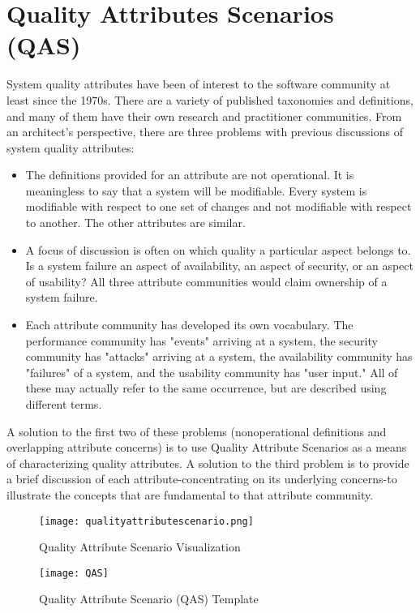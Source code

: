 \section{Quality Attributes Scenarios (QAS)}
System quality attributes have been of interest to the software community at least since the 1970s. There are a variety of published taxonomies and definitions, and many of them have their own research and practitioner communities. From an architect's perspective, there are three problems with previous discussions of system quality attributes:

\begin{itemize}
	\item The definitions provided for an attribute are not operational. It is meaningless to say that a system will be modifiable. Every system is modifiable with respect to one set of changes and not modifiable with respect to another. The other attributes are similar.
	\item A focus of discussion is often on which quality a particular aspect belongs to. Is a system failure an aspect of availability, an aspect of security, or an aspect of usability? All three attribute communities would claim ownership of a system failure.
	\item Each attribute community has developed its own vocabulary. The performance community has "events" arriving at a system, the security community has "attacks" arriving at a system, the availability community has "failures" of a system, and the usability community has "user input." All of these may actually refer to the same occurrence, but are described using different terms.
\end{itemize}

A solution to the first two of these problems (nonoperational definitions and overlapping attribute concerns) is to use Quality Attribute Scenarios as a means of characterizing quality attributes. A solution to the third problem is to provide a brief discussion of each attribute-concentrating on its underlying concerns-to illustrate the concepts that are fundamental to that attribute community.

\begin{figure}[H]
	\centering
	\texttt{[image: qualityattributescenario.png]}
	\caption{Quality Attribute Scenario Visualization}
\end{figure}

\begin{figure}[H]
  \center
  \texttt{[image: QAS]}
  \caption{Quality Attribute Scenario (QAS) Template}
\end{figure}

